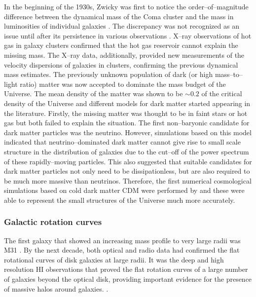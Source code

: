 \documentclass[paper=a4, fontsize=11pt]{scrartcl} %
\numberwithin{equation}{section} %
\numberwithin{figure}{section} %
\numberwithin{table}{section} %
\newcommand{\ignore}[1]{}
\begin{document}
In the beginning of the 1930s, Zwicky was first to notice the order--of--magnitude difference between the dynamical mass of the Coma cluster and the mass in luminosities of individual galaxies \citep[][]{Zwicky1993}.%
 The discrepancy was not recognized as an issue until after its persistence in various observations \citep[e.g. \ignore{Vera Rubin in 1970s}][]{Einasto+1974, Ostriker+1974}. X--ray observations of hot gas in galaxy clusters confirmed that the hot gas reservoir cannot explain the missing mass. The X--ray data, additionally, provided new measurements of the velocity dispersions of galaxies in clusters, confirming the previous dynamical mass estimates\ignore{(Forman et al. 1972, Gursky et al. 1972, Kellogg et al. 1973)}. The previously unknown population of dark (or high mass--to--light ratio) matter was now accepted to dominate the mass budget of the Universe. The mean density of the matter was shown to be $\sim 0.2$ of the critical density of the Universe and different models for dark matter started appearing in the literature. Firstly, the missing matter was thought to be in faint stars or hot gas but both failed to explain the situation\ignore{cite and explain why! or maybe not as it's not really important now!!}. The first non--baryonic candidate for dark matter particles was the neutrino. However, simulations based on this model \citep[][]{Doroshkevich+1978} indicated that neutrino--dominated dark matter cannot give rise to small scale structure in the distribution of galaxies due to the cut--off of the power spectrum of these rapidly--moving particles. This also suggested that suitable candidates for dark matter particles not only need to be dissipationless, but are also required to be much more massive than neutrinos\ignore{(Blumenthal et al. 1982, Bond et al. 1982, Peebles, 1982)}. Therefore, the first numerical cosmological simulations based on cold dark matter CDM were performed by \citep[][]{Melott+1983} and these were able to represent the small structures of the Universe much more accurately.

\subsubsection{Galactic rotation curves}

The first galaxy that showed an increasing mass profile to very large radii was M31 \citep[][]{Rubin.Ford1970}. By the next decade, both optical\ignore{ (Rubin+1978, Rubin+1980)} and radio\ignore{ (Bosma 1978)} data had confirmed the flat rotational curves of disk galaxies at large radii. It was the deep and high resolution HI observations that proved the flat rotation curves of a large number of galaxies beyond the optical disk, providing important evidence for the presence of massive halos around galaxies. \citet[see e.g.][]{Bosma1981, Begeman1989}. 
\end{document}
